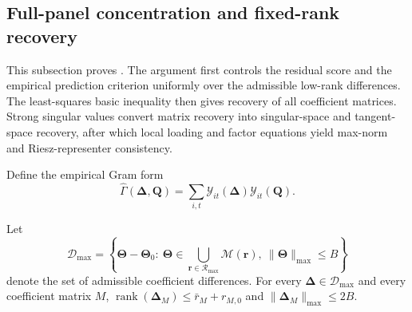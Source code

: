 \documentclass[11pt]{article}
\numberwithin{equation}{section}
\theoremstyle{remark}
\newcommand{\rank}{\operatorname{rank}}
\newcommand{\br}{\bm r}
\newcommand{\bQ}{\bm Q}
\newcommand{\bDelta}{\bm\Delta}
\newcommand{\bTheta}{\bm\Theta}
\newcommand{\calD}{\mathcal D}
\newcommand{\calM}{\mathcal M}
\newcommand{\calR}{\mathcal R}
\begin{document}
\subsection{Full-panel concentration and fixed-rank recovery}
\label{app:recovery}

This subsection proves . The argument first controls the residual score and the empirical prediction criterion uniformly over the admissible low-rank differences. The least-squares basic inequality then gives recovery of all coefficient matrices. Strong singular values convert matrix recovery into singular-space and tangent-space recovery, after which local loading and factor equations yield max-norm and Riesz-representer consistency.

Define the empirical Gram form
$$
\widehat\Gamma(\bDelta,\bQ)
=
\sum_{i,t}
\mathcal Y_{it}(\bDelta)
\mathcal Y_{it}(\bQ).
$$

Let
$$
\calD_{\max}
=
\left\{
\bTheta-\bTheta_0:
\ \bTheta\in\bigcup_{\br\in\calR_{\max}}\calM(\br),
\ \|\bTheta\|_{\max}\le B
\right\}
$$
denote the set of admissible coefficient differences. For every $\bDelta\in\calD_{\max}$ and every coefficient matrix $M$, $\rank(\bDelta_M)\le \bar r_M+r_{M,0}$ and $\|\bDelta_M\|_{\max}\le2B$.
\end{document}
